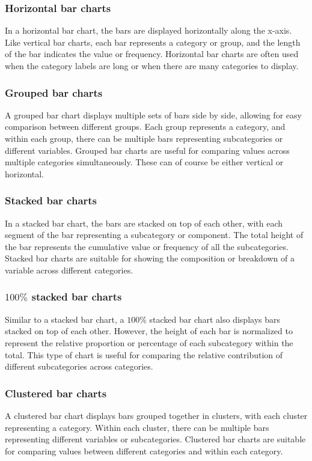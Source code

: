\documentclass[10pt]{extarticle}
\newcommand{\<}{\langle}
\renewcommand{\>}{\rangle}
\theoremstyle{mystyle}{\newtheorem*{remark}{Remark}}
\theoremstyle{mystyle}{\newtheorem*{remarks}{Remarks}}
\theoremstyle{mystyle}{\newtheorem*{example}{Example}}
\theoremstyle{mystyle}{\newtheorem*{examples}{Examples}}
\theoremstyle{definition}{\newtheorem*{exercise}{Exercise}}
\theoremstyle{warn}
\begin{document}
\subsubsection{Horizontal bar charts}
In a horizontal bar chart, the bars are displayed horizontally along the x-axis. Like vertical bar charts, each bar represents a category or group, and the length of the bar indicates the value or frequency. Horizontal bar charts are often used when the category labels are long or when there are many categories to display.

\subsubsection{Grouped bar charts}
A grouped bar chart displays multiple sets of bars side by side, allowing for easy comparison between different groups. Each group represents a category, and within each group, there can be multiple bars representing subcategories or different variables. Grouped bar charts are useful for comparing values across multiple categories simultaneously. These can of course be either vertical or horizontal.

\subsubsection{Stacked bar charts}
In a stacked bar chart, the bars are stacked on top of each other, with each segment of the bar representing a subcategory or component. The total height of the bar represents the cumulative value or frequency of all the subcategories. Stacked bar charts are suitable for showing the composition or breakdown of a variable across different categories.

\subsubsection{$100\%$ stacked bar charts}
Similar to a stacked bar chart, a $100\%$ stacked bar chart also displays bars stacked on top of each other. However, the height of each bar is normalized to represent the relative proportion or percentage of each subcategory within the total. This type of chart is useful for comparing the relative contribution of different subcategories across categories.

\subsubsection{Clustered bar charts}
A clustered bar chart displays bars grouped together in clusters, with each cluster representing a category. Within each cluster, there can be multiple bars representing different variables or subcategories. Clustered bar charts are suitable for comparing values between different categories and within each category.
\end{document}
